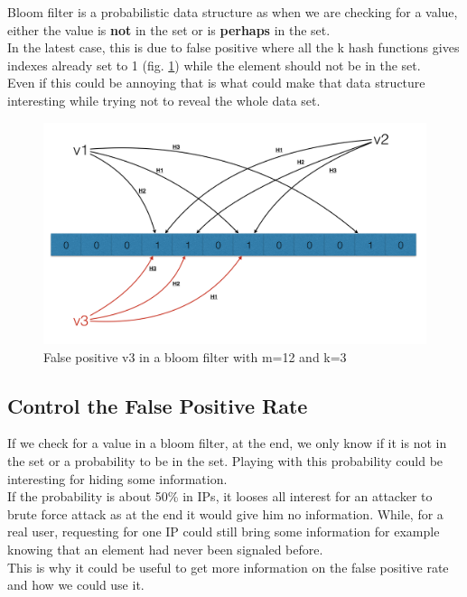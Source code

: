 \documentclass{eplmastersthesis}
\begin{document}
Bloom filter is a probabilistic data structure as when we are checking for a value, either the value is \textbf{not} in the set or is \textbf{perhaps} in the set. \\
In the latest case, this is due to false positive where all the k hash functions gives indexes already set to 1 (fig. \ref{bloom-2}) while the element should not be in the set.\\
Even if this could be annoying that is what could make that data structure interesting while trying not to reveal the whole data set.
\begin{figure}[h!]
	\begin{center}
		\includegraphics[scale=0.3]{res/bloom-2}
		\caption{False positive v3 in a bloom filter with m=12 and k=3}
		\label{bloom-2}
	\end{center}
\end{figure}

\subsection{Control the False Positive Rate}
If we check for a value in a bloom filter, at the end, we only know if it is not in the set or a probability to be in the set. Playing with this probability could be interesting for hiding some information. \\
If the probability is about 50\% in IPs, it looses all interest for an attacker to brute force attack as at the end it would give him no information. While, for a real user, requesting for one IP could still bring some information for example knowing that an element had never been signaled before.\\
This is why it could be useful to get more information on the false positive rate and how we could use it.\\
\end{document}
